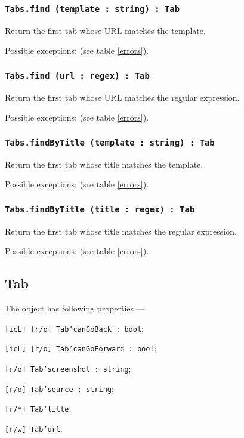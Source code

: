 \subsubsection{\texttt{Tabs.find (template : string) : Tab}}

Return the first tab whose URL matches the template.

Possible exceptions:  (see table \ref{errors}).

\subsubsection{\texttt{Tabs.find (url : regex) : Tab}}

Return the first tab whose URL matches the regular expression.

Possible exceptions:  (see table \ref{errors}).

\subsubsection{\texttt{Tabs.findByTitle (template : string) : Tab}}

Return the first tab whose title matches the template.

Possible exceptions:  (see table \ref{errors}).

\subsubsection{\texttt{Tabs.findByTitle (title : regex) : Tab}}

Return the first tab whose title matches the regular expression.

Possible exceptions:  (see table \ref{errors}).

\subsection{{\color{orange} Tab}}

The object \tab{} has following properties —
\begin{icItems}
	\item \texttt{[icL] [r/o] Tab'canGoBack : bool};
	\item \texttt{[icL] [r/o] Tab'canGoForward : bool};
	\item \texttt{[r/o] Tab'screenshot : string};
	\item \texttt{[r/o] Tab'source : string};
	\item \texttt{[r/*] Tab'title};
	\item \texttt{[r/w] Tab'url}.
\end{icItems}

